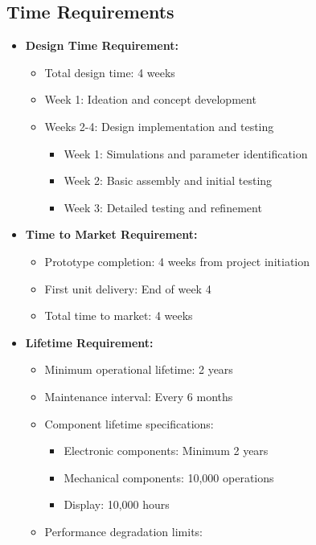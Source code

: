 \documentclass[a4paper,12pt]{article}
\begin{document}
\subsection{Time Requirements}
\begin{itemize}
    \item \textbf{Design Time Requirement:}
    \begin{itemize}
        \item Total design time: 4 weeks
        \item Week 1: Ideation and concept development
        \item Weeks 2-4: Design implementation and testing
        \begin{itemize}
            \item Week 1: Simulations and parameter identification
            \item Week 2: Basic assembly and initial testing
            \item Week 3: Detailed testing and refinement
        \end{itemize}
    \end{itemize}
    \item \textbf{Time to Market Requirement:}
    \begin{itemize}
        \item Prototype completion: 4 weeks from project initiation
        \item First unit delivery: End of week 4
        \item Total time to market: 4 weeks
    \end{itemize}
    \item \textbf{Lifetime Requirement:}
    \begin{itemize}
        \item Minimum operational lifetime: 2 years
        \item Maintenance interval: Every 6 months
        \item Component lifetime specifications:
        \begin{itemize}
            \item Electronic components: Minimum 2 years
            \item Mechanical components: 10,000 operations
            \item Display: 10,000 hours
        \end{itemize}
        \item Performance degradation limits:
        \begin{itemize}

\end{itemize}
\end{itemize}
\end{itemize}
\end{document}
